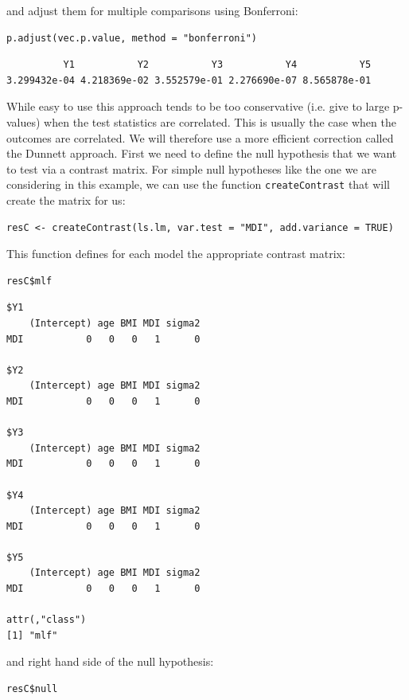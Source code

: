 \documentclass{article}
\begin{document}
\clearpage

and adjust them for multiple comparisons using Bonferroni:
\lstset{language=r,label= ,caption= ,captionpos=b,numbers=none}
\begin{lstlisting}
p.adjust(vec.p.value, method = "bonferroni")
\end{lstlisting}

\begin{verbatim}
          Y1           Y2           Y3           Y4           Y5 
3.299432e-04 4.218369e-02 3.552579e-01 2.276690e-07 8.565878e-01
\end{verbatim}

While easy to use this approach tends to be too conservative
(i.e. give to large p-values) when the test statistics are
correlated. This is usually the case when the outcomes are
correlated. We will therefore use a more efficient correction called
the Dunnett approach. First we need to define the null hypothesis
that we want to test via a contrast matrix. For simple null hypotheses
like the one we are considering in this example, we can use the
function \texttt{createContrast} that will create the matrix for us:
\lstset{language=r,label= ,caption= ,captionpos=b,numbers=none}
\begin{lstlisting}
resC <- createContrast(ls.lm, var.test = "MDI", add.variance = TRUE)
\end{lstlisting}

This function defines for each model the appropriate contrast matrix:
\lstset{language=r,label= ,caption= ,captionpos=b,numbers=none}
\begin{lstlisting}
resC$mlf
\end{lstlisting}
\begin{verbatim}
$Y1
    (Intercept) age BMI MDI sigma2
MDI           0   0   0   1      0

$Y2
    (Intercept) age BMI MDI sigma2
MDI           0   0   0   1      0

$Y3
    (Intercept) age BMI MDI sigma2
MDI           0   0   0   1      0

$Y4
    (Intercept) age BMI MDI sigma2
MDI           0   0   0   1      0

$Y5
    (Intercept) age BMI MDI sigma2
MDI           0   0   0   1      0

attr(,"class")
[1] "mlf"
\end{verbatim}

and right hand side of the null hypothesis:
\lstset{language=r,label= ,caption= ,captionpos=b,numbers=none}
\begin{lstlisting}
resC$null
\end{lstlisting}
\end{document}
